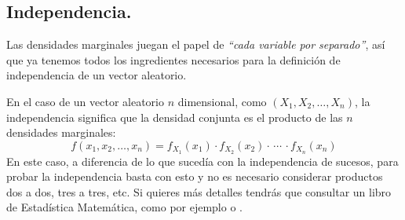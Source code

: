 \subsection{Independencia.}
\label{cap04:subsec:IndependenciaVectorAleatorioDiscreto}

Las densidades marginales juegan el papel de {\em ``cada variable por separado''}, así que ya tenemos todos los ingredientes necesarios para la definición de independencia de un vector aleatorio.

    \begin{center}
    \end{center}
En el caso de un vector aleatorio $n$ dimensional, como $(X_1,X_2,\ldots,X_n)$, la independencia significa que la densidad conjunta es el producto de las $n$ densidades marginales:
\begin{equation}
\label{cap04:ecu:indepedenciaVariablesAleatoriasDiscretasCasoNdimensional}
f(x_1,x_2,\ldots,x_n) = f_{X_1}(x_1)\cdot f_{X_2}(x_2)\cdot\,\cdots\,\cdot f_{X_n}(x_n)
\end{equation}
En este caso, a diferencia de lo que sucedía con la independencia de sucesos, para probar la independencia basta con esto y no es necesario considerar productos dos a dos, tres a tres, etc. Si quieres más detalles tendrás que consultar un libro de Estadística Matemática, como por ejemplo \cite{horra2003estadistica} o \cite{Shao_2003_book}.


